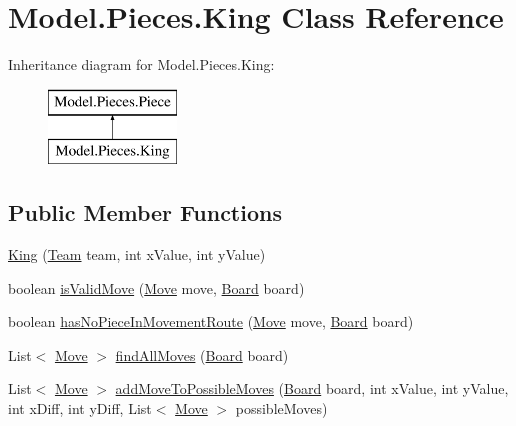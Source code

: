 \hypertarget{class_model_1_1_pieces_1_1_king}{}\section{Model.\+Pieces.\+King Class Reference}
\label{class_model_1_1_pieces_1_1_king}
Inheritance diagram for Model.\+Pieces.\+King\+:\begin{figure}[H]
\begin{center}
\leavevmode
\includegraphics[height=2.000000cm]{class_model_1_1_pieces_1_1_king}
\end{center}
\end{figure}
\subsection*{Public Member Functions}
\begin{DoxyCompactItemize}
\item 
\hyperlink{class_model_1_1_pieces_1_1_king_a064e3c2161d2fc9153efb4618493550e}{King} (\hyperlink{class_model_1_1_team}{Team} team, int x\+Value, int y\+Value)
\item 
boolean \hyperlink{class_model_1_1_pieces_1_1_king_afdaa2fec4da9bc1c217e9a3c88700cea}{is\+Valid\+Move} (\hyperlink{class_model_1_1_move}{Move} move, \hyperlink{class_model_1_1_board}{Board} board)
\item 
boolean \hyperlink{class_model_1_1_pieces_1_1_king_aaf00b36ede859653e9c3ae8c72ea302c}{has\+No\+Piece\+In\+Movement\+Route} (\hyperlink{class_model_1_1_move}{Move} move, \hyperlink{class_model_1_1_board}{Board} board)
\item 
List$<$ \hyperlink{class_model_1_1_move}{Move} $>$ \hyperlink{class_model_1_1_pieces_1_1_king_ac947a57bac9d81d02b64e8bc470257bf}{find\+All\+Moves} (\hyperlink{class_model_1_1_board}{Board} board)
\item 
List$<$ \hyperlink{class_model_1_1_move}{Move} $>$ \hyperlink{class_model_1_1_pieces_1_1_king_a4d77bfe79a1c8087c8ce91397388c6d5}{add\+Move\+To\+Possible\+Moves} (\hyperlink{class_model_1_1_board}{Board} board, int x\+Value, int y\+Value, int x\+Diff, int y\+Diff, List$<$ \hyperlink{class_model_1_1_move}{Move} $>$ possible\+Moves)
\end{DoxyCompactItemize}


